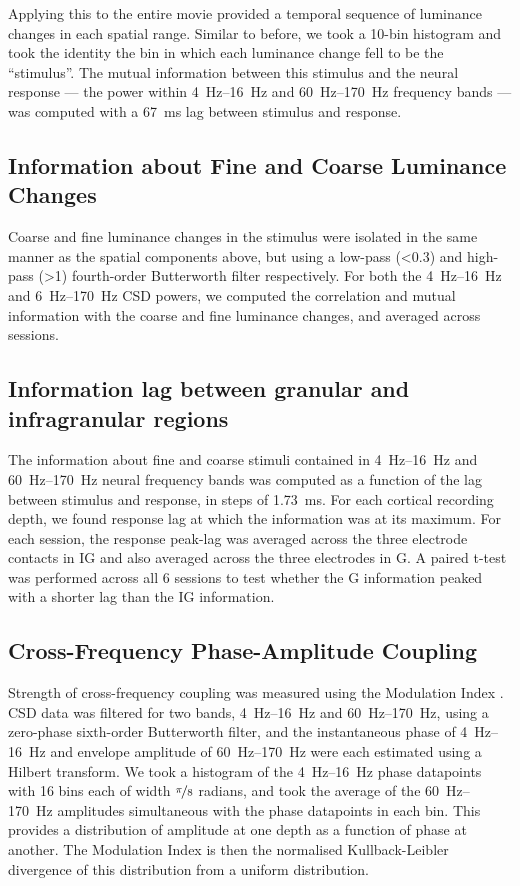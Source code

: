 Applying this to the entire movie provided a temporal sequence of luminance changes in each spatial range.
Similar to before, we took a 10-bin histogram and took the identity the bin in which each luminance change fell to be the ``stimulus''.
The mutual information between this stimulus and the neural response --- the power within \SIrange{4}{16}{Hz} and \SIrange{60}{170}{Hz} frequency bands --- was computed with a \SI{67}{\milli\second} lag between stimulus and response.

\subsection{Information about Fine and Coarse Luminance Changes}
Coarse and fine luminance changes in the stimulus were isolated in the same manner as the spatial components above, but using a low-pass (\SI{<0.3}{\cpd}) and high-pass (\SI{>1}{\cpd}) fourth-order Butterworth filter respectively.
For both the \SIrange{4}{16}{Hz} and \SIrange{6}{170}{Hz} \ac{CSD} powers, we computed the correlation and mutual information with the coarse and fine luminance changes, and averaged across sessions.

\subsection{Information lag between granular and infragranular regions}
The information about fine and coarse stimuli contained in \SIrange{4}{16}{Hz} and \SIrange{60}{170}{Hz} neural frequency bands was computed as a function of the lag between stimulus and response, in steps of \SI{1.73}{\milli\second}.
For each cortical recording depth, we found response lag at which the information was at its maximum.
For each session, the response peak-lag was averaged across the three electrode contacts in \ac{IG} and also averaged across the three electrodes in \ac{G}.
A paired t-test was performed across all 6 sessions to test whether the \ac{G} information peaked with a shorter lag than the \ac{IG} information.

\subsection{Cross-Frequency Phase-Amplitude Coupling}
Strength of cross-frequency coupling was measured using the Modulation Index \citep{Tort2010}.
\ac{CSD} data was filtered for two bands, \SIrange{4}{16}{Hz} and \SIrange{60}{170}{Hz}, using a zero-phase sixth-order Butterworth filter, and the instantaneous phase of \SIrange{4}{16}{Hz} and envelope amplitude of \SIrange{60}{170}{Hz} were each estimated using a Hilbert transform.
We took a histogram of the \SIrange{4}{16}{Hz} phase datapoints with 16 bins each of width $\nicefrac{\pi}{8}$ radians, and took the average of the \SIrange{60}{170}{Hz} amplitudes simultaneous with the phase datapoints in each bin.
This provides a distribution of amplitude at one depth as a function of phase at another.
The Modulation Index is then the normalised Kullback-Leibler divergence of this distribution from a uniform distribution.

